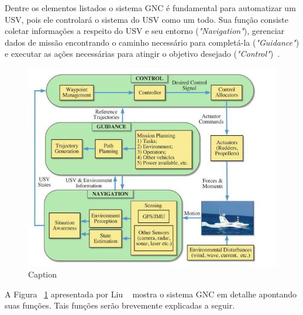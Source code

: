         Dentre os elementos listados o sistema GNC é fundamental para automatizar um USV, pois ele controlará o sistema do USV como um todo. Sua função consiste coletar informações a respeito do USV e seu entorno (\textit{"Navigation"}), gerenciar dados de missão encontrando o caminho necessário para completá-la (\textit{"Guidance"}) e executar as ações necessárias para atingir o objetivo desejado (\textit{"Control"})~\cite{LIU201671}.
        
        \begin{figure}
            \centering
            \includegraphics[width=\textwidth]{fig/chap2/gnc_system.png}
            \caption{Caption}
            \label{fig:Liu2016_gncSystem}
        \end{figure}
    
        A Figura ~\ref{fig:Liu2016_gncSystem} apresentada por Liu \etal~\cite{LIU201671} mostra o sistema GNC em detalhe apontando suas funções. Tais funções serão brevemente explicadas a seguir.
        
